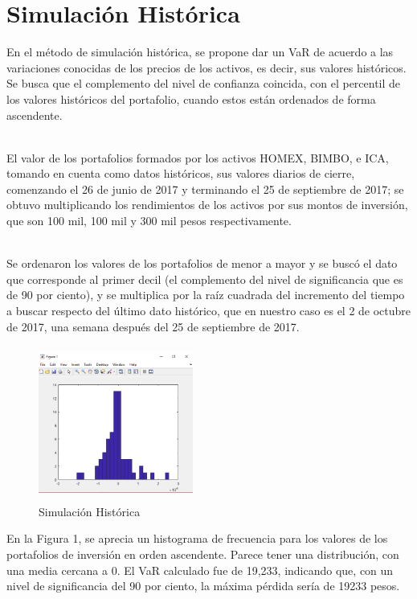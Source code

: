 \documentclass[12pt]{article}
\begin{document}
\section{Simulación Histórica}
En el método de simulación histórica, se propone dar un VaR de acuerdo a las variaciones conocidas de los precios de los activos, es decir, sus valores históricos. Se busca que el complemento del nivel de confianza coincida, con el percentil de los valores históricos del portafolio, cuando estos están ordenados de forma ascendente.

\ \\%
El valor de los portafolios formados por los activos HOMEX, BIMBO, e ICA, tomando en cuenta como datos históricos, sus valores diarios de cierre, comenzando el 26 de junio de 2017 y terminando el 25 de septiembre de 2017; se obtuvo multiplicando los rendimientos de los activos por sus montos de inversión, que son 100 mil, 100 mil y 300 mil pesos respectivamente.

\ \\%
Se ordenaron los valores de los portafolios de menor a mayor y se buscó el dato que corresponde al primer decil (el complemento del nivel de significancia que es de 90 por ciento), y se multiplica por la raíz cuadrada del incremento del tiempo a buscar respecto del último dato histórico, que en nuestro caso es el 2 de octubre de 2017, una semana después del 25 de septiembre de 2017. 

\begin{figure}[h]
\begin{minipage}{7in}
\begin{center}
\includegraphics[width=2in,height=2in]{hist.PNG}
\caption{Simulación Histórica} 
\label{Figure 1} 
\end{center}
\end{minipage}
\end{figure}

En la Figura 1, se aprecia un histograma de frecuencia para los valores de los portafolios de inversión en orden ascendente. Parece tener una distribución, con una media cercana a 0. El VaR calculado fue de 19,233, indicando que, con un nivel de significancia del 90 por ciento, la máxima pérdida sería de 19233 pesos.
\end{document}
